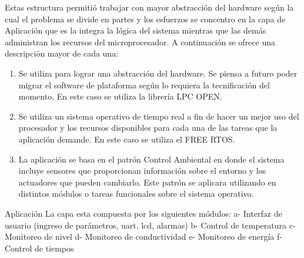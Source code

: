 Estas estructura permitió trabajar con mayor abstracción del hardware según la cual el problema se divide en partes y los esfuerzos se concentro en la capa de Aplicación que es la integra la lógica del sistema mientras que las demás administran los recursos del microprocesador. A continuación se ofrece una descripción mayor de cada una:
\begin{enumerate}
	\item Se utiliza para lograr una abstracción del hardware. Se piensa a futuro poder migrar el software de plataforma según lo requiera la tecnificación del momento. En este caso se utiliza la librería LPC OPEN.

	\item Se utiliza un sistema operativo de tiempo real a fin de hacer un mejor uso del procesador y los recursos disponibles para cada una de las tareas que la aplicación demande. En este caso se utiliza el FREE RTOS.

	\item La aplicación se basa en el patrón Control Ambiental en donde el sistema incluye sensores que proporcionan información sobre el entorno y los actuadores que pueden cambiarlo. Este patrón se aplicara utilizando en distintos módulos o tareas funcionales sobre el sistema operativo.
\end{enumerate}

Aplicación
La capa esta compuesta por los siguientes módulos:
a- Interfaz de usuario (ingreso de parámetros, uart, lcd, alarmas) 
b- Control de temperatura
c- Monitoreo de nivel
d- Monitoreo de conductividad
e- Monitoreo de energía
f- Control de tiempos

